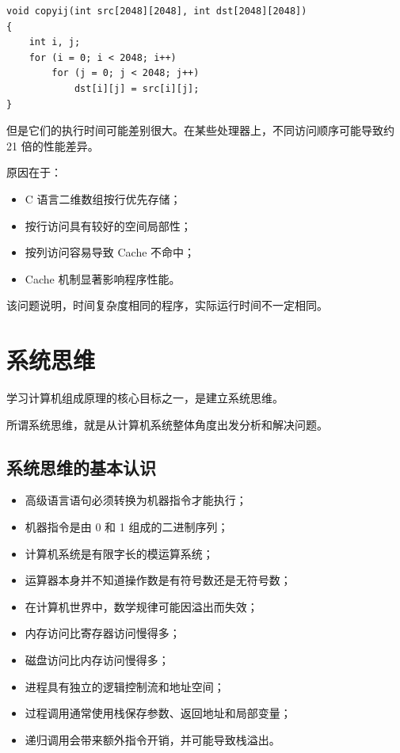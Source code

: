 \documentclass[12pt,a4paper]{ctexart}
\begin{document}
\begin{verbatim}
void copyij(int src[2048][2048], int dst[2048][2048])
{
    int i, j;
    for (i = 0; i < 2048; i++)
        for (j = 0; j < 2048; j++)
            dst[i][j] = src[i][j];
}
\end{verbatim}

但是它们的执行时间可能差别很大。在某些处理器上，不同访问顺序可能导致约 21 倍的性能差异。

原因在于：

\begin{itemize}
    \item C 语言二维数组按行优先存储；
    \item 按行访问具有较好的空间局部性；
    \item 按列访问容易导致 Cache 不命中；
    \item Cache 机制显著影响程序性能。
\end{itemize}

该问题说明，时间复杂度相同的程序，实际运行时间不一定相同。

\section{系统思维}

学习计算机组成原理的核心目标之一，是建立系统思维。

所谓系统思维，就是从计算机系统整体角度出发分析和解决问题。

\subsection{系统思维的基本认识}

\begin{itemize}
    \item 高级语言语句必须转换为机器指令才能执行；
    \item 机器指令是由 0 和 1 组成的二进制序列；
    \item 计算机系统是有限字长的模运算系统；
    \item 运算器本身并不知道操作数是有符号数还是无符号数；
    \item 在计算机世界中，数学规律可能因溢出而失效；
    \item 内存访问比寄存器访问慢得多；
    \item 磁盘访问比内存访问慢得多；
    \item 进程具有独立的逻辑控制流和地址空间；
    \item 过程调用通常使用栈保存参数、返回地址和局部变量；
    \item 递归调用会带来额外指令开销，并可能导致栈溢出。
\end{itemize}
\end{document}
